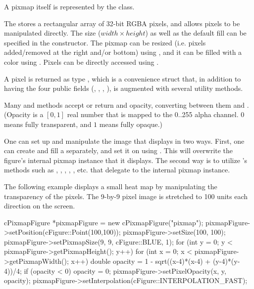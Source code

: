 A pixmap itself is represented by the  class.

The  stores a rectangular array of 32-bit RGBA pixels,
and allows pixels to be manipulated directly. The size ($width \times
height$) as well as the default fill can be specified in the constructor.
The pixmap can be resized (i.e. pixels added/removed at the right and/or bottom)
using , and it can be filled with a color using .
Pixels can be directly accessed using .

A pixel is returned as type , which is a convenience
struct that, in addition to having the four public  fields
(, , , ), is augmented with several
utility methods.

Many  and  methods accept or return
 and opacity, converting between them and
. (Opacity is a $[0,1]$ real number that is mapped to the
0..255 alpha channel. $0$ means fully transparent, and $1$ means fully
opaque.)

One can set up and manipulate the image that  displays
in two ways. First, one can create and fill a 
separately, and set it on  using .
This will overwrite the figure's internal pixmap instance that it displays.
The second way is to utilize 's methods such as
, , ,
, , etc. that delegate to
the internal pixmap instance.

The following example displays a small heat map by manipulating the
transparency of the pixels. The 9-by-9 pixel image is stretched to
100 units each direction on the screen.

\begin{cpp}
cPixmapFigure *pixmapFigure = new cPixmapFigure("pixmap");
pixmapFigure->setPosition(cFigure::Point(100,100));
pixmapFigure->setSize(100, 100);
pixmapFigure->setPixmapSize(9, 9, cFigure::BLUE, 1);
for (int y = 0; y < pixmapFigure->getPixmapHeight(); y++) {
    for (int x = 0; x < pixmapFigure->getPixmapWidth(); x++) {
        double opacity = 1 - sqrt((x-4)*(x-4) + (y-4)*(y-4))/4;
        if (opacity < 0) opacity = 0;
        pixmapFigure->setPixelOpacity(x, y, opacity);
    }
}
pixmapFigure->setInterpolation(cFigure::INTERPOLATION_FAST);
\end{cpp}


